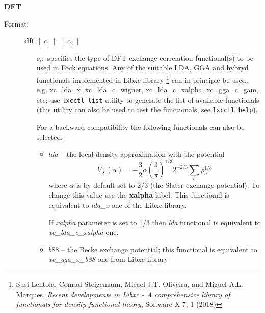\documentclass[12pt,a4paper]{article}
\begin{document}
\begin{description}
\item \textbf{DFT}
\begin{description}
\item[Format:] \textbf{dft}  $[\;c_1\;]\;\; [\;c_2\;]$ \\
\begin{itemize}
\item[$c_i:$] specifies the type of DFT exchange-correlation functional(s) to be used in
  Fock equations. Any of the suitable LDA, GGA and hybryd functionals implemented in Libxc
  library%
  \footnote{Susi Lehtola, Conrad Steigemann, Micael J.T. Oliveira, and Miguel
    A.L. Marques, \textsl{Recent developments in Libxc - A comprehensive library of
      functionals for density functional theory}, Software X 7, 1 (2018)} can in principle
  be used, e.g. xc\_lda\_x, xc\_lda\_c\_wigner, xc\_lda\_c\_xalpha, xc\_gga\_c\_gam, etc;
  use \texttt{lxcctl list} utility to generate the list of available functionals (this
  utility can also be used to test the functionals, see \texttt{lxcctl help}).

  \bigskip
  
  For a backward compatibility the following functionals can also be selected:
  \begin{itemize}

\item $lda$ -- the local density approximation with the potential
\begin{equation*}
         V_X(\alpha)=-\frac{3}{2} \alpha \left(\frac{3}{\pi}\right)^{1/3} 2^{-2/3}
                \sum_{\sigma} \rho_{\sigma}^{1/3}
\end{equation*}
where $\alpha$ is by default set to 2/3 (the Slater exchange
potential). \linebreak[4] To change this value use the \textbf{xalpha} label.
This functional is equivalent to \textsl{lda\_x} one of the Libxc library.

If \textsl{xalpha} parameter is set to 1/3 then \textsl{lda} functional is equivalent to
\textsl{xc\_lda\_c\_xalpha} one.

\item $b88$ -- the Becke exchange potential; this functional is equivalent to
\textsl{xc\_gga\_x\_b88} one from Libxc library



\end{itemize}
\end{itemize}
\end{description}
\end{description}
\end{document}
